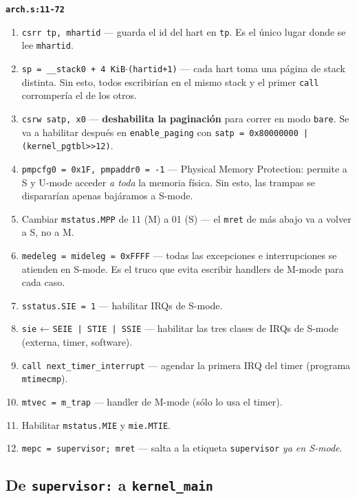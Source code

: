 \documentclass[11pt,a4paper]{article}
\begin{document}
\begin{walkthrough}
\textbf{\texttt{arch.s:11-72}}

\begin{enumerate}[leftmargin=*,nosep,label=\arabic*.]
    \item \texttt{csrr tp, mhartid} — guarda el id del hart en
        \texttt{tp}. Es el único lugar donde se lee \texttt{mhartid}.
    \item \texttt{sp = \_\_stack0 + 4\,KiB$\cdot$(hartid+1)} —
        cada hart toma una página de stack distinta. Sin esto,
        todos escribirían en el mismo stack y el primer
        \texttt{call} corrompería el de los otros.
    \item \texttt{csrw satp, x0} — \textbf{deshabilita la paginación}
        para correr en modo \texttt{bare}. Se va a habilitar después
        en \texttt{enable\_paging} con \texttt{satp = 0x80000000 |
        (kernel\_pgtbl>>12)}.
    \item \texttt{pmpcfg0 = 0x1F, pmpaddr0 = -1} — Physical Memory
        Protection: permite a S y U-mode acceder \emph{a toda} la
        memoria física. Sin esto, las trampas se dispararían apenas
        bajáramos a S-mode.
    \item Cambiar \texttt{mstatus.MPP} de 11 (M) a 01 (S) — el
        \texttt{mret} de más abajo va a volver a S, no a M.
    \item \texttt{medeleg = mideleg = 0xFFFF} — todas las
        excepciones e interrupciones se atienden en S-mode. Es el
        truco que evita escribir handlers de M-mode para cada caso.
    \item \texttt{sstatus.SIE = 1} — habilitar IRQs de S-mode.
    \item \texttt{sie} ← \texttt{SEIE | STIE | SSIE} — habilitar
        las tres clases de IRQs de S-mode (externa, timer, software).
    \item \texttt{call next\_timer\_interrupt} — agendar la primera
        IRQ del timer (programa \texttt{mtimecmp}).
    \item \texttt{mtvec = m\_trap} — handler de M-mode (sólo lo
        usa el timer).
    \item Habilitar \texttt{mstatus.MIE} y \texttt{mie.MTIE}.
    \item \texttt{mepc = supervisor; mret} — salta a la etiqueta
        \texttt{supervisor} \emph{ya en S-mode}.
\end{enumerate}
\end{walkthrough}

\subsection{De \texttt{supervisor:} a \texttt{kernel\_main}}
\end{document}
